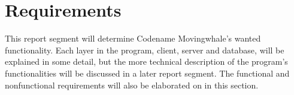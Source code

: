 \section{Requirements}

This report segment will determine Codename Movingwhale's wanted functionality. Each layer in the program, client, server and database, will be explained in some detail, but the more technical description of the program's functionalities will be discussed in a later report segment. The functional and nonfunctional requirements will also be elaborated on in this  section.



